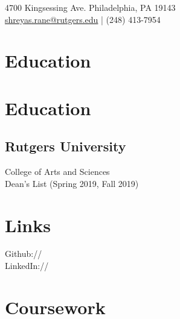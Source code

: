 \documentclass[]{deedy-resume-openfont}
\begin{document}
%
%
\lastupdated

%
%
{ 
{4700 Kingsessing Ave. Philadelphia, PA 19143} \\
\href{mailto:shreyas.rane@rutgers.edu}{shreyas.rane@rutgers.edu} | (248) 413-7954
}

%
%

\begin{minipage}[t]{0.33\textwidth} 


\section{Education} 

\section{Education} 

\subsection{Rutgers University}
College of Arts and Sciences\\
Dean's List (Spring 2019, Fall 2019) \\
\sectionsep

\section{Links} 
Github:// \href{https://github.com/twopiaresquared}{} \\
LinkedIn://  \href{https://www.linkedin.com/in/shreyas-rane-760a9b155/}{} \\
\sectionsep

\section{Coursework}

\end{minipage}
\end{document}
